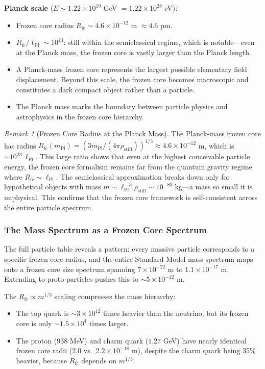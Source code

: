 \documentclass[11pt,a4paper]{article}
\newcommand{\lPl}{\ensuremath{\ell_{\mathrm{Pl}}}}
\newcommand{\mPl}{\ensuremath{m_{\mathrm{Pl}}}}
\newcommand{\rhostiff}{\ensuremath{\rho_{\mathrm{stiff}}}}
\newcommand{\Rfc}{\ensuremath{R_{\mathrm{fc}}}}
\theoremstyle{definition}
\theoremstyle{remark}
\newtheorem{remark}[theorem]{Remark}
\begin{document}
\textbf{Planck scale} ($E \sim 1.22 \times 10^{19}$ GeV $= 1.22 \times 10^{28}$ eV):
\begin{itemize}[leftmargin=*, itemsep=0.2em]
\item Frozen core radius $\Rfc \sim 4.6 \times 10^{-12}$ m $\approx 4.6$ pm.
\item $\Rfc/\lPl \sim 10^{23}$: still within the semiclassical regime, which is notable---even at the Planck mass, the frozen core is vastly larger than the Planck length.
\item A Planck-mass frozen core represents the largest possible elementary field displacement. Beyond this scale, the frozen core becomes macroscopic and constitutes a dark compact object rather than a particle.
\item The Planck mass marks the boundary between particle physics and astrophysics in the frozen core hierarchy.
\end{itemize}

\begin{remark}[Frozen Core Radius at the Planck Mass]
The Planck-mass frozen core has radius $\Rfc(\mPl) = (3\mPl/(4\pi\rhostiff))^{1/3} \approx 4.6 \times 10^{-12}$ m, which is $\sim 10^{23}\,\lPl$. This large ratio shows that even at the highest conceivable particle energy, the frozen core formalism remains far from the quantum gravity regime where $\Rfc \sim \lPl$. The semiclassical approximation breaks down only for hypothetical objects with mass $m \sim \lPl^3 \rhostiff \sim 10^{-80}$ kg---a mass so small it is unphysical. This confirms that the frozen core framework is self-consistent across the entire particle spectrum.
\end{remark}

\subsubsection{The Mass Spectrum as a Frozen Core Spectrum}

The full particle table reveals a pattern: every massive particle corresponds to a specific frozen core radius, and the entire Standard Model mass spectrum maps onto a frozen core size spectrum spanning $7 \times 10^{-22}$ m to $1.1 \times 10^{-17}$ m. Extending to proto-particles pushes this to $\sim 5 \times 10^{-12}$ m.

\vspace{0.5em}
\noindent
The $\Rfc \propto m^{1/3}$ scaling compresses the mass hierarchy:
\begin{itemize}[leftmargin=*, itemsep=0.3em]
\item The top quark is $\sim 3 \times 10^{12}$ times heavier than the neutrino, but its frozen core is only $\sim 1.5 \times 10^4$ times larger.
\item The proton ($938$ MeV) and charm quark ($1.27$ GeV) have nearly identical frozen core radii ($2.0$ vs.\ $2.2 \times 10^{-18}$ m), despite the charm quark being 35\% heavier, because $\Rfc$ depends on $m^{1/3}$.
\end{itemize}
\end{document}
